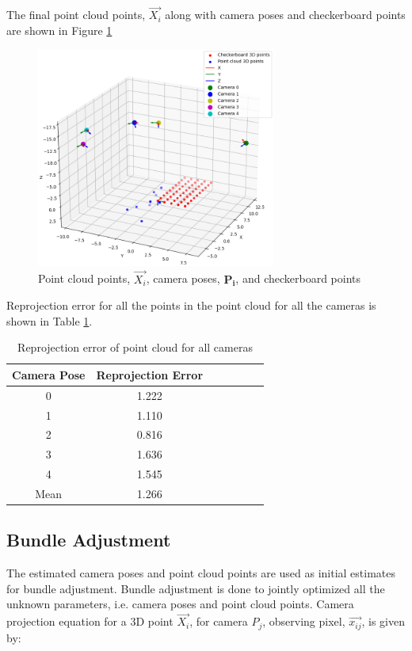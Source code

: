 \documentclass{article}
\begin{document}
The final point cloud points, $\vec{X_i}$ along with camera poses and checkerboard points are shown in Figure \ref{fig:env_cam_frame_point_cloud}

\begin{figure}[h]
    \centering
    \includegraphics[width=0.7\textwidth]{images/env_cam_frame_point_cloud.png}
    \caption{Point cloud points, $\vec{X_i}$, camera poses, $\mathbf{P_i}$, and checkerboard points}
    \label{fig:env_cam_frame_point_cloud}
\end{figure}

Reprojection error for all the points in the point cloud for all the cameras is shown in Table \ref{tab:reprojection_error_point_cloud}.

\begin{table}[h]
    \centering
    \begin{tabular}{|c|c|c|c|c|c|c|}
        \hline
        Camera Pose & Reprojection Error \\
        \hline
        0 & 1.222 \\
        1 & 1.110 \\
        2 & 0.816 \\
        3 & 1.636 \\
        4 & 1.545 \\
        Mean & 1.266 \\
        \hline
    \end{tabular}
    \caption{Reprojection error of point cloud for all cameras}
    \label{tab:reprojection_error_point_cloud}
\end{table}


\subsection{Bundle Adjustment}
The estimated camera poses and point cloud points are used as initial estimates for bundle adjustment. Bundle adjustment is done to jointly optimized all the unknown parameters, i.e. camera poses and point cloud points. 
Camera projection equation for a 3D point $\vec{X_i}$, for camera $P_j$, observing pixel, $\vec{x_{ij}}$, is given by:
\end{document}
